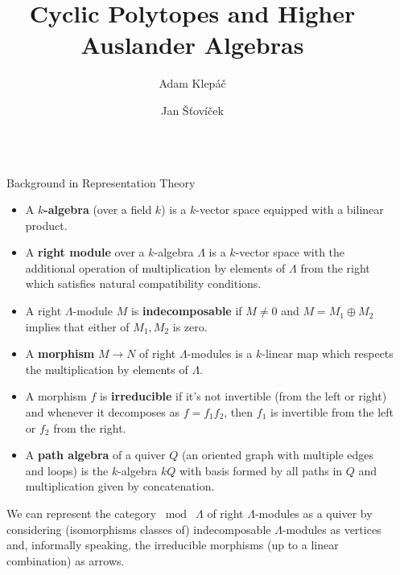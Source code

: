 \documentclass[final]{beamer}
\title{\huge Cyclic Polytopes and Higher Auslander Algebras}
\author{Adam Klepáč \and Jan Šťovíček}
\institute[shortinst]{Charles University in Prague}
\newlength{\sepwidth}
\newlength{\colwidth}
\newcommand{\separatorcolumn}{\begin{column}{\sepwidth}\end{column}}
\begin{document}
\begin{frame}[t]
\begin{columns}[t]
\separatorcolumn

\begin{column}{\colwidth}
  \begin{block}{Background in Representation Theory}
    \begin{itemize}
     \vspace*{-12pt}
     \item A \textbf{$k$-algebra} (over a field $k$) is a $k$-vector space
       equipped with a bilinear product.
     \item A \textbf{right module} over a $k$-algebra $\Lambda$ is a $k$-vector
       space with the additional operation of multiplication by elements of
       $\Lambda$ from the right which satisfies natural compatibility
       conditions.
     \item A right $\Lambda$-module $M$ is \textbf{indecomposable} if $M \neq 0$
       and $M = M_1 \oplus M_2$ implies that either of $M_1,M_2$ is zero.
     \item A \textbf{morphism} $M \to N$ of right $\Lambda$-modules is a
       $k$-linear map which respects the multiplication by elements of
       $\Lambda$.
     \item A morphism $f$ is \textbf{irreducible} if it's not invertible (from
       the left or right) and whenever it decomposes as $f = f_1 f_2$, then
       $f_1$ is invertible from the left or $f_2$ from the right.
     \item A \textbf{path algebra} of a quiver $Q$ (an oriented graph with
       multiple edges and loops) is the $k$-algebra $kQ$ with basis formed by
       all paths in $Q$ and multiplication given by concatenation.
    \end{itemize}

    We can represent the category $\bmod \; \Lambda$ of right $\Lambda$-modules
    as a quiver  by considering (isomorphisms classes of) indecomposable
    $\Lambda$-modules as vertices and, informally speaking, the irreducible
    morphisms (up to a linear combination) as arrows.

    \begin{figure}[h]
     \centering
\end{figure}
\end{block}
\end{column}
\end{columns}
\end{frame}
\end{document}
